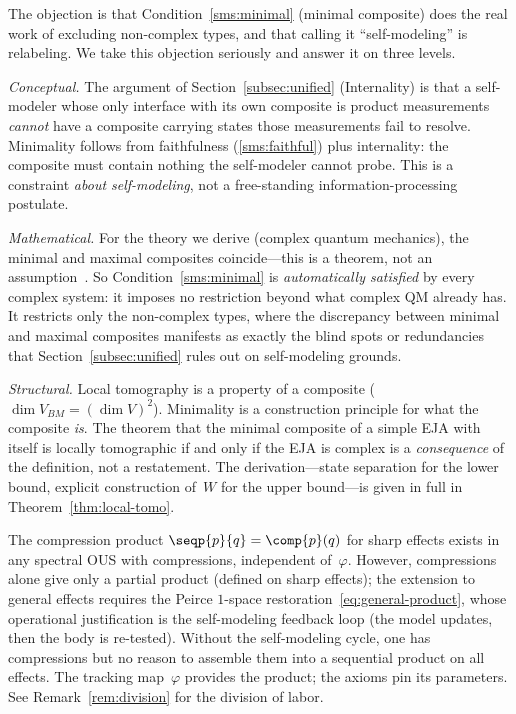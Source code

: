 \begin{remark}
\label{rem:minimality-objection}
The objection is that Condition~\ref{sms:minimal} (minimal
composite) does the real work of excluding non-complex types, and
that calling it ``self-modeling'' is relabeling.  We take this
objection seriously and answer it on three levels.

\emph{Conceptual.}
The argument of Section~\ref{subsec:unified} (Internality) is that a
self-modeler whose only interface with its own composite is product
measurements \emph{cannot} have a composite carrying states those
measurements fail to resolve.  Minimality follows from faithfulness
(\ref{sms:faithful}) plus internality: the composite must contain
nothing the self-modeler cannot probe.  This is a constraint
\emph{about self-modeling}, not a free-standing information-processing
postulate.

\emph{Mathematical.}
For the theory we derive (complex quantum mechanics), the minimal
and maximal composites coincide---this is a theorem, not an
assumption~\cite{Barnum2023}.  So Condition~\ref{sms:minimal} is
\emph{automatically satisfied} by every complex system: it imposes
no restriction beyond what complex QM already has.  It restricts
only the non-complex types, where the discrepancy between minimal
and maximal composites manifests as exactly the blind spots or
redundancies that Section~\ref{subsec:unified} rules out on
self-modeling grounds.

\emph{Structural.}
Local tomography is a property of a composite
($\dim V_{BM} = (\dim V)^2$).  Minimality is a construction
principle for what the composite \emph{is}.  The theorem that the
minimal composite of a simple EJA with itself is locally tomographic
if and only if the EJA is complex is a \emph{consequence} of the
definition, not a restatement.  The derivation---state separation
for the lower bound, explicit construction of~$W$ for the upper
bound---is given in full in Theorem~\ref{thm:local-tomo}.
\end{remark}

\begin{remark}
\label{rem:phi-inert-objection}
The compression product $\seqp{p}{q} = \comp{p}(q)$ for sharp
effects exists in any spectral OUS with compressions, independent
of~$\varphi$.  However, compressions alone give only a partial
product (defined on sharp effects); the extension to general effects
requires the Peirce $1$-space
restoration~\eqref{eq:general-product}, whose operational
justification is the self-modeling feedback loop (the model updates,
then the body is re-tested).  Without the self-modeling cycle, one
has compressions but no reason to assemble them into a sequential
product on all effects.  The tracking map~$\varphi$ provides the
product; the axioms pin its parameters.  See
Remark~\ref{rem:division} for the division of labor.
\end{remark}

